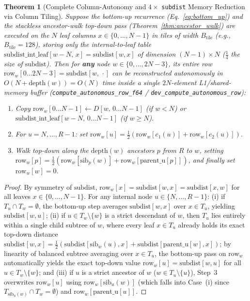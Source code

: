 \documentclass[11pt,a4paper]{article}
\newtheorem{theorem}{Theorem}[section]
\theoremstyle{definition}
\begin{document}
\begin{theorem}[Complete Column-Autonomy and $4\times$ \texttt{subdist} Memory Reduction via Column Tiling]
\label{thm:column_tiling}
Suppose the bottom-up recurrence (Eq.~\eqref{eq:bottom_up}) and the stackless ancestor-walk top-down pass (Theorem~\ref{thm:ancestor_walk}) are executed on the $N$ leaf columns $x \in \{0, \dots, N-1\}$ in tiles of width $B_{\text{tile}}$ (e.g., $B_{\text{tile}} = 128$), storing only the internal-to-leaf table $\text{subdist\_int\_leaf}[w - N, \, x] = \text{subdist}[w, x]$ of dimension $(N-1) \times N$ ($\frac{1}{4}$ the size of $\text{subdist}$). Then for \textbf{any} node $w \in \{0, \dots, 2N-3\}$, its entire row $\text{row}_w[0 \dots 2N-3] = \text{subdist}[w, \, \cdot]$ can be reconstructed autonomously in $O(N + \text{depth}(w)) = O(N)$ time inside a single $2N$-element L1/shared-memory buffer (\texttt{compute\_autonomous\_row\_f64} / \texttt{dev\_compute\_autonomous\_row}):
\begin{enumerate}
    \item Copy $\text{row}_w[0 \dots N-1] \leftarrow D[w, \, 0 \dots N-1]$ (if $w < N$) or $\text{subdist\_int\_leaf}[w - N, \, 0 \dots N-1]$ (if $w \ge N$).
    \item For $u = N, \dots, R-1$: set $\text{row}_w[u] = \frac{1}{2}(\text{row}_w[c_1(u)] + \text{row}_w[c_2(u)])$.
    \item Walk top-down along the $\text{depth}(w)$ ancestors $p$ from $R$ to $w$, setting $\text{row}_w[p] = \frac{1}{2}(\text{row}_w[\text{sib}_p(w)] + \text{row}_w[\text{parent\_u}[p]])$, and finally set $\text{row}_w[w] = 0$.
\end{enumerate}
\end{theorem}
\begin{proof}
By symmetry of $\text{subdist}$, $\text{row}_w[x] = \text{subdist}[w, x] = \text{subdist}[x, w]$ for all leaves $x \in \{0, \dots, N-1\}$. For any internal node $u \in \{N, \dots, R-1\}$: (i) if $T_u \cap T_w = \emptyset$, the bottom-up step averages $\text{subdist}[w, x]$ over $x \in T_u$, yielding $\text{subdist}[w, u]$; (ii) if $u \in T_w \setminus \{w\}$ is a strict descendant of $w$, then $T_u$ lies entirely within a single child subtree of $w$, where every leaf $x \in T_u$ already holds its exact top-down distance $\text{subdist}[w, x] = \frac{1}{2}(\text{subdist}[\text{sib}_w(u), x] + \text{subdist}[\text{parent\_u}[w], x])$; by linearity of balanced subtree averaging over $x \in T_u$, the bottom-up pass on $\text{row}_w$ automatically yields the exact top-down value $\text{row}_w[u] = \text{subdist}[w, u]$ for all $u \in T_w \setminus \{w\}$; and (iii) if $u$ is a strict ancestor of $w$ ($w \in T_u \setminus \{u\}$), Step~3 overwrites $\text{row}_w[u]$ using $\text{row}_w[\text{sib}_u(w)]$ (which falls into Case~(i) since $T_{\text{sib}_u(w)} \cap T_w = \emptyset$) and $\text{row}_w[\text{parent\_u}[u]]$.
\end{proof}
\end{document}
